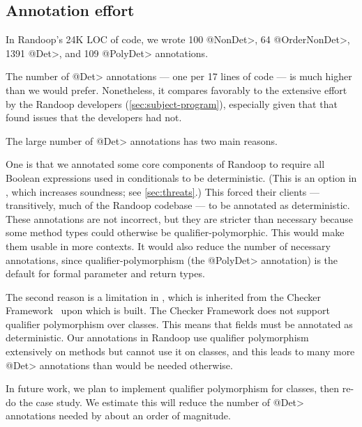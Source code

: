 \subsection{Annotation effort}

In Randoop's 24K LOC of code, we wrote
100 \<@NonDet>,
64 \<@OrderNonDet>,
1391 \<@Det>,
and 109 \<@PolyDet> annotations.

The number of \<@Det> annotations --- one per 17 lines of code --- is much
higher than we would prefer.
Nonetheless, it compares favorably to the
extensive effort by the Randoop developers (\cref{sec:subject-program}),
especially given that that \theDeterminismChecker found issues that the
developers had not.

The large number of \<@Det> annotations has two main reasons.

One is that we annotated some core components of Randoop to require all
Boolean expressions used in conditionals to be deterministic.  (This is an
option in \theDeterminismCheckerImplementation, which increases soundness;
see \cref{sec:threats}.)  This forced
their clients --- transitively, much of the Randoop codebase --- to be
annotated as deterministic.
These annotations are not incorrect, but they are stricter than necessary
because some method types could otherwise be qualifier-polymorphic.
This would make them usable in more contexts.  It would also reduce the
number of necessary annotations, since qualifier-polymorphism (the
\<@PolyDet> annotation) is the default for
formal parameter and return types.

The second reason is a limitation in \theDeterminismCheckerImplementation,
which is inherited from the Checker Framework~\cite{checker-framework-tool} upon which
\theDeterminismChecker is built.
The Checker Framework does not support qualifier polymorphism over
classes.  This means that fields must be annotated as deterministic.  Our annotations in
Randoop use qualifier polymorphism extensively on methods but cannot use it
on classes, and this leads to many more \<@Det> annotations than would be
needed otherwise.

In future work, we plan to implement qualifier polymorphism for classes,
then re-do the case study.  We estimate this will reduce the number of
\<@Det> annotations needed by about an order of magnitude.


